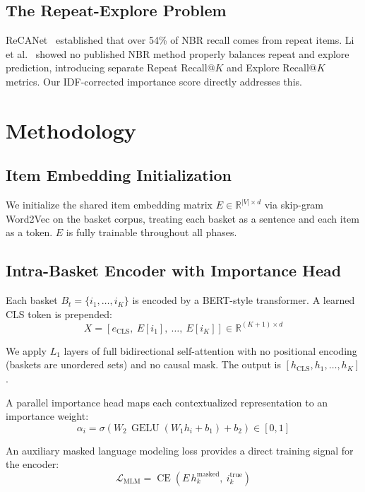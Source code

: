 \documentclass[conference]{IEEEtran}
\begin{document}
\subsection{The Repeat-Explore Problem}
ReCANet~\cite{ariannezhad2022recanet} established that over 54\% of NBR recall comes from repeat items. Li et al.~\cite{li2023next} showed no published NBR method properly balances repeat and explore prediction, introducing separate Repeat Recall@$K$ and Explore Recall@$K$ metrics. Our IDF-corrected importance score directly addresses this.


\section{Methodology}
\label{sec:method}

\subsection{Item Embedding Initialization}
We initialize the shared item embedding matrix
$E \in \mathbb{R}^{|V| \times d}$ via skip-gram Word2Vec on the basket
corpus, treating each basket as a sentence and each item as a token.
$E$ is fully trainable throughout all phases.

\subsection{Intra-Basket Encoder with Importance Head}
Each basket $B_t = \{i_1, \ldots, i_K\}$ is encoded by a BERT-style
transformer. A learned CLS token is prepended:
\begin{equation}
X = [e_{\text{CLS}},\ E[i_1],\ \ldots,\ E[i_K]] \in \mathbb{R}^{(K+1) \times d}
\end{equation}

We apply $L_1$ layers of full bidirectional self-attention with no
positional encoding (baskets are unordered sets) and no causal mask.
The output is $[h_{\text{CLS}}, h_1, \ldots, h_K]$.

A parallel importance head maps each contextualized representation to an importance weight:
\begin{equation}
\alpha_i = \sigma\!\left(W_2\, \operatorname{GELU}(W_1 h_i + b_1) + b_2\right) \in [0,1]
\end{equation}

An auxiliary masked language modeling loss provides a direct training signal for the encoder:
\begin{equation}
\mathcal{L}_{\text{MLM}} = \operatorname{CE}\!\left(E\, h_k^{\text{masked}},\ i_k^{\text{true}}\right)
\end{equation}
\end{document}
